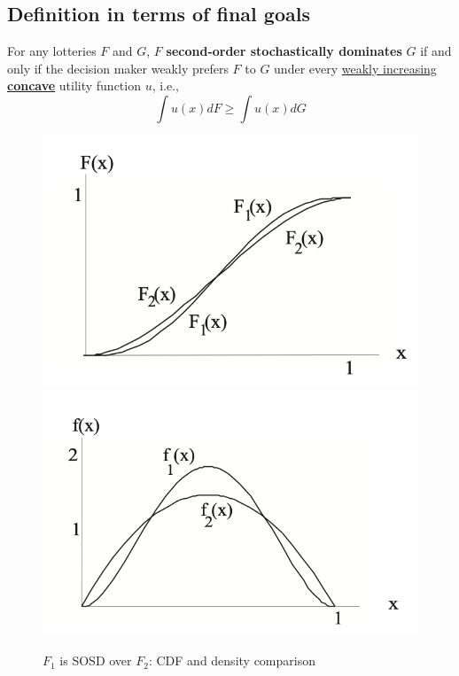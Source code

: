 \documentclass[11pt]{elegantbook}
\begin{document}
\subsection{Definition in terms of final goals}
\begin{definition}
    \normalfont
    For any lotteries $F$ and $G$, $F$ \textbf{second-order stochastically dominates} $G$ if and only if the decision maker weakly prefers $F$ to $G$ under every \underline{weakly increasing \textbf{concave}} utility function $u$, i.e.,
    $$\int u (x) dF \geq \int u(x) dG$$
\end{definition}
\begin{center}\begin{figure}[htbp]
    \centering
    \includegraphics[scale=0.25]{SOSD_1.png}
    \includegraphics[scale=0.25]{SOSD_2.png}
    \caption{$F_1$ is SOSD over $F_2$: CDF and density comparison}
    \label{}
\end{figure}\end{center}
\end{document}
